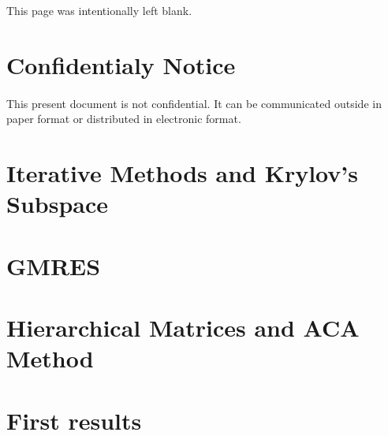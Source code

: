 \documentclass[twoside, 12pt]{article}
\begin{document}
\section*{}
\vfill
\paragraph{}
\begin{center}
    This page was intentionally left blank.
\end{center}
\vfill

\newpage

\section*{Confidentialy Notice}
\vfill
\paragraph{}
This present document is not confidential. It can be communicated outside in paper format
or distributed in electronic format.
\vfill






\newpage
\tableofcontents

\newpage
\listoffigures

\fancyhead[CE]{\leftmark}

\newpage
\section{Iterative Methods and Krylov's Subspace}


\newpage
\section{GMRES}


\newpage
\section{Hierarchical Matrices and ACA Method}


\newpage
\section{First results}


\cleardoublepage %


\nocite{*}

%
\end{document}
